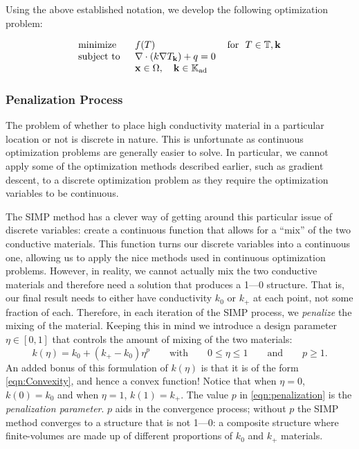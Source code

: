 Using the above established notation, we develop the following optimization problem:

\begin{equation}
	\begin{tabular}{lll}
		\text{minimize }   & $f(T)$                                                   & \text{for } $T\in\mathbb{T},\mathbf{k}$ \\
		\text{subject to } & $\nabla\cdot\left(k\nabla T_{\mathbf{k}}\right)+q=0$  &                                      \\
		& $\mathbf{x}\in\Omega,\quad\mathbf{k}\in\mathbb{K}_{\text{ad}}$ &                                      
	\end{tabular}\label{SIMP-Optimization-Problem}
\end{equation}

\subsubsection*{Penalization Process}
The problem of whether to place high conductivity material in a particular location or not is discrete in nature. This is unfortunate as continuous optimization problems are generally easier to solve. In particular, we cannot apply some of the optimization methods described earlier, such as gradient descent, to a discrete optimization problem as they require the optimization variables to be continuous.

The SIMP method has a clever way of getting around this particular issue of discrete variables: create a continuous function that allows for a ``mix'' of the two conductive materials. This function turns our discrete variables into a continuous one, allowing us to apply the nice methods used in continuous optimization problems. However, in reality, we cannot actually mix the two conductive materials and therefore need a solution that produces a 1---0 structure. That is, our final result needs to either have conductivity $k_0$ or $k_+$ at each point, not some fraction of each. Therefore, in each iteration of the SIMP process, we \textit{penalize} the mixing of the material. Keeping this in mind we introduce a design parameter $\eta\in\left[0,1\right]$ that controls the amount of mixing of the two materials:
\begin{equation}
	k\left(\eta\right)=k_0+\left(k_+-k_0\right)\eta^p\qquad\text{with}\qquad 0\leq\eta\leq 1\qquad\text{and}\qquad p\geq1.\label{eqn:penalization}
\end{equation}
An added bonus of this formulation of $k(\eta)$ is that it is of the form \eqref{eqn:Convexity}, and hence a convex function! Notice that when $\eta=0$, $k\left(0\right)=k_0$ and when $\eta=1$, $k\left(1\right)=k_+$. The value $p$ in \eqref{eqn:penalization} is the \textit{penalization parameter}. $p$ aids in the convergence process; without $p$ the SIMP method converges to a structure that is not 1---0: a composite structure where finite-volumes are made up of different proportions of $k_0$ and $k_+$ materials.

